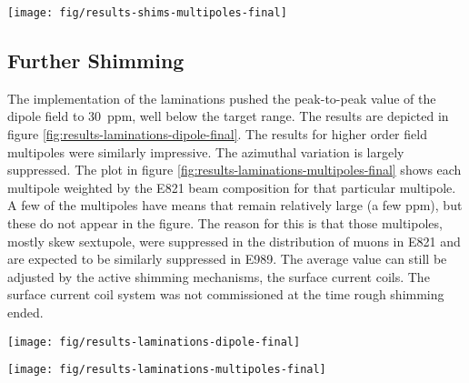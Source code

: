 \begin{sidewaysfigure}
\centering
\texttt{[image: fig/results-shims-multipoles-final]}
\caption{
    The plot shows the rough shimming multipoles after full optimization with the built-in shim kit.  The dominant sources of uncertainty appear as the colors with the most area in the plot, i.e., the normal and skew quadrupole terms. 
    \label{fig:results-shims-multipoles-final}
}
\end{sidewaysfigure}

\subsection{Further Shimming}

The implementation of the laminations pushed the peak-to-peak value of the dipole field to \SI{30}{ppm}, well below the target range.  The results are depicted in figure \ref{fig:results-laminations-dipole-final}.  The results for higher order field multipoles were similarly impressive.  The azimuthal variation is largely suppressed.  The plot in figure \ref{fig:results-laminations-multipoles-final} shows each multipole weighted by the E821 beam composition for that particular multipole.  A few of the multipoles have means that remain relatively large (a few ppm), but these do not appear in the figure.  The reason for this is that those multipoles, mostly skew sextupole, were suppressed in the distribution of muons in E821 and are expected to be similarly suppressed in E989.  The average value can still be adjusted by the active shimming mechanisms, the surface current coils.  The surface current coil system was not commissioned at the time rough shimming ended.

\begin{sidewaysfigure}
\centering
\texttt{[image: fig/results-laminations-dipole-final]}
\caption{
    The final rough shimming dipole field for E989 in red compared with the PRD field plot for E821.  The horizontal bands indicate \SI{\pm 25}{ppm} around the central value which was target for E989.  The resulting dipole field beat the peak-to-peak target by almost a factor of two and E821 by a factor of three. 
    \label{fig:results-laminations-dipole-final}
}
\end{sidewaysfigure}

\begin{sidewaysfigure}
\centering
\texttt{[image: fig/results-laminations-multipoles-final]}
\caption{The plot shows each multipole weighted by the E821 beam composition for that particular multipole.  A few of the multipoles have mean values that remain relatively large (a few ppm), but these do not appear in the figure.  The reason for this is that those multipoles, mostly skew sextupole, were suppressed in the distribution of muons in E821 and are expected to be similarly suppressed in E989. \label{fig:results-laminations-multipoles-final}}
\end{sidewaysfigure}

